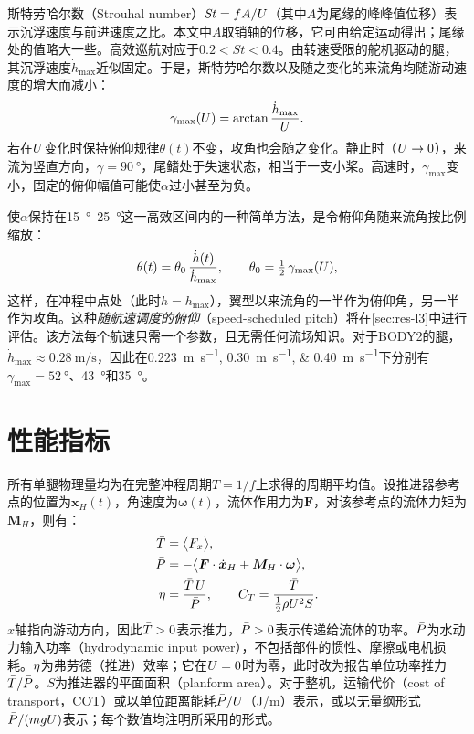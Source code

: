 斯特劳哈尔数（Strouhal number）$\mathit{St}=fA/U$（其中$A$为尾缘的峰峰值位移）表示沉浮速度与前进速度之比。本文中$A$取销轴的位移，它可由给定运动得出；尾缘处的值略大一些。高效巡航对应于$0.2<\mathit{St}<0.4$\cite{Taylor2003,Triantafyllou1991}。由转速受限的舵机驱动的腿，其沉浮速度$\dot h_\text{max}$近似固定。于是，斯特劳哈尔数以及随之变化的来流角均随游动速度的增大而减小：
\begin{equation}
  \gamma_\text{max}(U) = \arctan\frac{\dot h_\text{max}}{U}.
  \label{eq:gammamax}
\end{equation}
若在$U$变化时保持俯仰规律$\theta(t)$不变，攻角也会随之变化。静止时（$U\to0$），来流为竖直方向，$\gamma=\SI{90}{\degree}$，尾鳍处于失速状态，相当于一支小桨。高速时，$\gamma_\text{max}$变小，固定的俯仰幅值可能使$\alpha$过小甚至为负。

使$\alpha$保持在\SIrange{15}{25}{\degree}这一高效区间内\cite{Read2003,Hover2004}的一种简单方法，是令俯仰角随来流角按比例缩放：
\begin{equation}
  \theta(t) = \theta_0\,\frac{\dot h(t)}{\dot h_\text{max}}, \qquad \theta_0=\tfrac12\,\gamma_\text{max}(U),
  \label{eq:l3}
\end{equation}
这样，在冲程中点处（此时$\dot h=\dot h_\text{max}$），翼型以来流角的一半作为俯仰角，另一半作为攻角。这种\emph{随航速调度的俯仰}（speed-scheduled pitch）将在\cref{sec:res-l3}中进行评估。该方法每个航速只需一个参数，且无需任何流场知识。对于BODY2的腿，$\dot h_\text{max}\approx\SI{0.28}{\metre\per\second}$，因此在\SIlist{0.223;0.30;0.40}{\metre\per\second}下分别有$\gamma_\text{max}=\SI{52}{\degree}$、\SI{43}{\degree}和\SI{35}{\degree}。

\section{性能指标}
\label{sec:fund-metrics}

所有单腿物理量均为在完整冲程周期$T=1/f$上求得的周期平均值。设推进器参考点的位置为$\bm x_H(t)$，角速度为$\bm\omega(t)$，流体作用力为$\bm F$，对该参考点的流体力矩为$\bm M_H$，则有：
\begin{align}
  \bar{T} &= \big\langle F_x \big\rangle, \label{eq:thrust}\\
  \bar{P} &= -\big\langle \bm F\cdot\dot{\bm x}_H + \bm M_H\cdot\bm\omega \big\rangle, \label{eq:power}\\
  \eta &= \frac{\bar{T}\,U}{\bar{P}}, \qquad C_T=\frac{\bar{T}}{\tfrac12\rho U^2S}. \label{eq:eta}
\end{align}
$x$轴指向游动方向，因此$\bar{T}>0$表示推力，$\bar{P}>0$表示传递给流体的功率。$\bar{P}$为水动力输入功率（hydrodynamic input power），不包括部件的惯性、摩擦或电机损耗。$\eta$为弗劳德（推进）效率；它在$U=0$时为零，此时改为报告单位功率推力$\bar{T}/\bar{P}$。$S$为推进器的平面面积（planform area）。对于整机，运输代价（cost of transport，COT）或以单位距离能耗$\bar{P}/U$（J/m）表示，或以无量纲形式$\bar{P}/(mgU)$表示；每个数值均注明所采用的形式。


